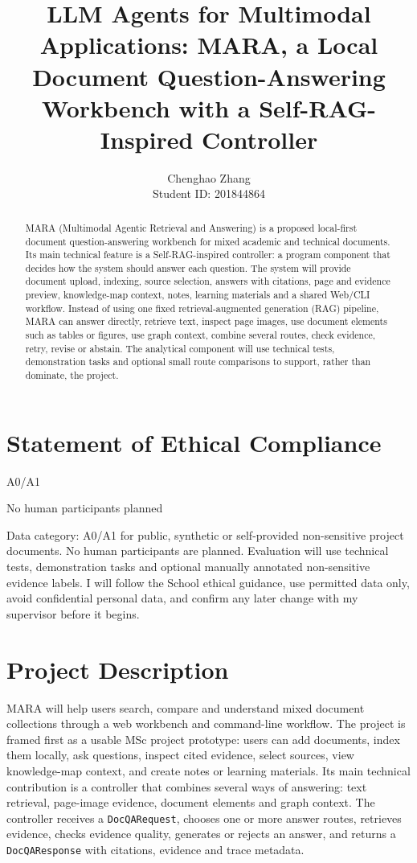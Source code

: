\documentclass{article}
\title{LLM Agents for Multimodal Applications: MARA, a Local Document Question-Answering Workbench with a Self-RAG-Inspired Controller}
\author{%
  Chenghao Zhang\\
  Student ID: 201844864
}
\begin{document}
\maketitle

\begin{abstract}
MARA (Multimodal Agentic Retrieval and Answering) is a proposed local-first document question-answering workbench for mixed academic and technical documents. Its main technical feature is a Self-RAG-inspired controller: a program component that decides how the system should answer each question. The system will provide document upload, indexing, source selection, answers with citations, page and evidence preview, knowledge-map context, notes, learning materials and a shared Web/CLI workflow. Instead of using one fixed retrieval-augmented generation (RAG) pipeline, MARA can answer directly, retrieve text, inspect page images, use document elements such as tables or figures, use graph context, combine several routes, check evidence, retry, revise or abstain. The analytical component will use technical tests, demonstration tasks and optional small route comparisons to support, rather than dominate, the project.
\end{abstract}

\section*{Statement of Ethical Compliance}

\begin{description}\itemsep=0pt
\item[Data Category:] A0/A1
\item[Participant Category:] No human participants planned
\end{description}

Data category: A0/A1 for public, synthetic or self-provided non-sensitive project documents. No human participants are planned. Evaluation will use technical tests, demonstration tasks and optional manually annotated non-sensitive evidence labels. I will follow the School ethical guidance, use permitted data only, avoid confidential personal data, and confirm any later change with my supervisor before it begins.

\section{Project Description}

MARA will help users search, compare and understand mixed document collections through a web workbench and command-line workflow. The project is framed first as a usable MSc project prototype: users can add documents, index them locally, ask questions, inspect cited evidence, select sources, view knowledge-map context, and create notes or learning materials. Its main technical contribution is a controller that combines several ways of answering: text retrieval, page-image evidence, document elements and graph context. The controller receives a \texttt{DocQARequest}, chooses one or more answer routes, retrieves evidence, checks evidence quality, generates or rejects an answer, and returns a \texttt{DocQAResponse} with citations, evidence and trace metadata.
\end{document}
